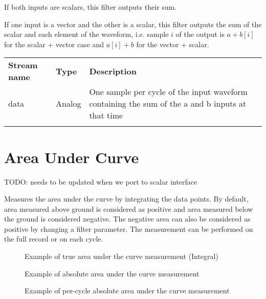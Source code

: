 If both inputs are scalars, this filter outputs their sum.

If one input is a vector and the other is a scalar, this filter outputs the sum  of the scalar and each element of the
waveform, i.e. sample $i$ of the output is $a + b[i]$ for the scalar + vector case and $a[i] + b$ for the vector +
scalar.

\begin{tabularx}{16cm}{llX}
\thickhline
\textbf{Stream name} & \textbf{Type} & \textbf{Description} \\
\thickhline
data & Analog & One sample per cycle of the input waveform containing the sum of the a and b inputs at that time \\
\thickhline
\end{tabularx}


\pagebreak
\section{Area Under Curve}
\label{filter:AreaUnderCurve}

TODO: needs to be updated when we port to scalar interface

Measures the area under the curve by integrating the data points. By default, area measured above ground is considered
as positive and area measured below the ground is considered negative. The negative area can also be considered as positive
by changing a filter parameter. The measurement can be performed on the full record or on each cycle.

\begin{figure}[h]
\centering
{}
\caption{Example of true area under the curve measurement (Integral)}
\end{figure}

\begin{figure}[h]
\centering
{}
\caption{Example of absolute area under the curve measurement}
\end{figure}

\pagebreak

\begin{figure}[h]
\centering
{}
\caption{Example of per-cycle absolute area under the curve measurement}
\end{figure}

